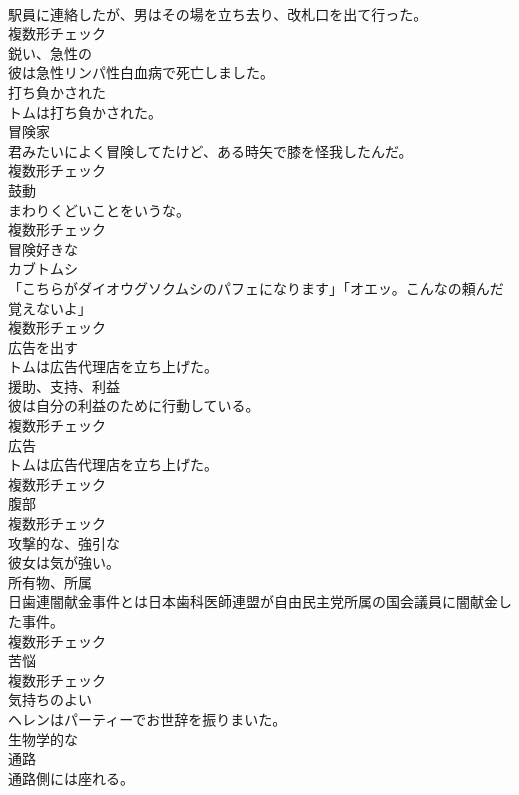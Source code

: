 \documentclass[8pt]{extreport}
\begin{document}
\begin{CJK}{UTF8}{min}
\\	駅員に連絡したが、男はその場を立ち去り、改札口を出て行った。	
\\	複数形チェック
\\	[形容詞]	鋭い、急性の	
\\	彼は急性リンパ性白血病で死亡しました。	
\\	[形容詞]	打ち負かされた	
\\	トムは打ち負かされた。	
\\	[名詞]	冒険家	
\\	君みたいによく冒険してたけど、ある時矢で膝を怪我したんだ。	
\\	複数形チェック
\\	[名詞]	鼓動	
\\	まわりくどいことをいうな。	
\\	複数形チェック
\\	[形容詞]	冒険好きな	
\\	[名詞]	カブトムシ	
\\	「こちらがダイオウグソクムシのパフェになります」「オエッ。こんなの頼んだ覚えないよ」	
\\	複数形チェック
\\	[動詞]	広告を出す	
\\	トムは広告代理店を立ち上げた。	
\\	[名詞]	援助、支持、利益	
\\	彼は自分の利益のために行動している。	
\\	複数形チェック
\\	[名詞]	広告	
\\	トムは広告代理店を立ち上げた。	
\\	複数形チェック
\\	[名詞]	腹部	
\\	複数形チェック
\\	[形容詞]	攻撃的な、強引な	
\\	彼女は気が強い。	
\\	[名詞]	所有物、所属	
\\	日歯連闇献金事件とは日本歯科医師連盟が自由民主党所属の国会議員に闇献金した事件。	
\\	複数形チェック
\\	[名詞]	苦悩	
\\	複数形チェック
\\	[形容詞]	気持ちのよい	
\\	ヘレンはパーティーでお世辞を振りまいた。	
\\	[形容詞]	生物学的な	
\\	[名詞]	通路	
\\	通路側には座れる。	

\end{CJK}
\end{document}

